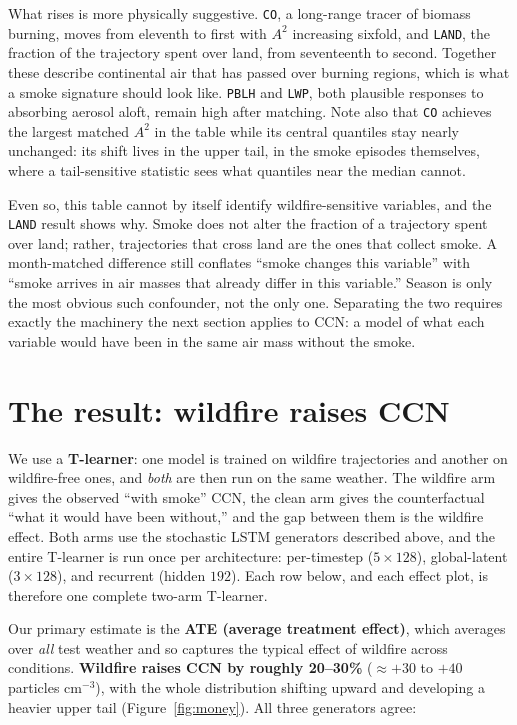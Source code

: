 \documentclass[11pt]{article}
\begin{document}
What rises is more physically suggestive. \texttt{CO}, a long-range tracer of biomass
burning, moves from eleventh to first with $A^2$ increasing sixfold, and \texttt{LAND}, the
fraction of the trajectory spent over land, from seventeenth to second. Together these
describe continental air that has passed over burning regions, which is what a smoke
signature should look like. \texttt{PBLH} and \texttt{LWP}, both plausible responses to
absorbing aerosol aloft, remain high after matching. Note also that \texttt{CO} achieves
the largest matched $A^2$ in the table while its central quantiles stay nearly unchanged:
its shift lives in the upper tail, in the smoke episodes themselves, where a tail-sensitive
statistic sees what quantiles near the median cannot.

Even so, this table cannot by itself identify wildfire-sensitive variables, and the
\texttt{LAND} result shows why. Smoke does not alter the fraction of a trajectory spent
over land; rather, trajectories that cross land are the ones that collect smoke. A
month-matched difference still conflates ``smoke changes this variable'' with ``smoke
arrives in air masses that already differ in this variable.'' Season is only the most
obvious such confounder, not the only one. Separating the two requires exactly the
machinery the next section applies to CCN: a model of what each variable would have been in
the same air mass without the smoke.

\section*{The result: wildfire raises CCN}
We use a \textbf{T-learner}: one model is trained on wildfire trajectories and another on
wildfire-free ones, and \emph{both} are then run on the same weather. The wildfire arm
gives the observed ``with smoke'' CCN, the clean arm gives the counterfactual ``what it
would have been without,'' and the gap between them is the wildfire effect. Both arms use
the stochastic LSTM generators described above, and the entire T-learner is run once per
architecture: per-timestep ($5\times128$), global-latent ($3\times128$), and recurrent
(hidden $192$). Each row below, and each effect plot, is therefore one complete two-arm
T-learner.

Our primary estimate is the \textbf{ATE (average treatment effect)}, which averages over
\emph{all} test weather and so captures the typical effect of wildfire across conditions.
\textbf{Wildfire raises CCN by roughly 20--30\%} ($\approx +30$ to $+40$ particles
cm$^{-3}$), with the whole distribution shifting upward and developing a heavier upper tail
(Figure~\ref{fig:money}). All three generators agree:
\end{document}
